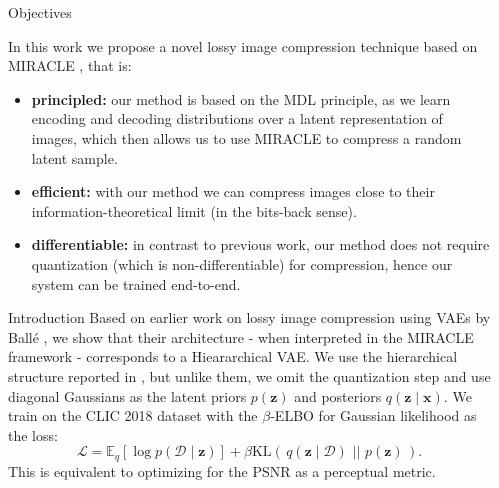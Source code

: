 \documentclass[final]{beamer}
\newlength{\sepwid}
\newlength{\onecolwid}
\renewcommand{\vec}[1]{\mathbf{#1}}
\renewcommand{\L}{\mathcal{L}}
\newcommand{\D}{\mathcal{D}}
\newcommand{\Exp}{\mathbb{E}}
\newcommand{\KL}[2]{\mathrm{KL}\left(\,#1\,\,||\,\,#2\,\right)}
\begin{document}
\begin{frame}[t] %

\begin{columns}[t] %

\begin{column}{\sepwid}\end{column} %

\begin{column}{\onecolwid} %


\begin{alertblock}{Objectives}

In this work we propose a novel lossy image compression technique based on
MIRACLE \cite{havasi2018minimal}, that is:
\begin{itemize}
\item \textbf{principled:} our method is based on the MDL principle, as we
  learn encoding and decoding distributions over a latent representation of
  images, which then allows us to use MIRACLE to compress a random
  latent sample.
\item \textbf{efficient:} with our method we can compress images close to their
  information-theoretical limit (in the bits-back sense).
\item \textbf{differentiable:} in contrast to previous work, our method does not
  require quantization (which is non-differentiable) for compression, hence our
  system can be trained end-to-end.
\end{itemize}

\end{alertblock}


\begin{block}{Introduction}
Based on earlier work on lossy image compression using VAEs by Ball\'e
\cite{balle2018variational}, we show that their architecture - when interpreted in
the MIRACLE framework - corresponds to a Hieararchical VAE. 
We use the hierarchical structure reported in \cite{balle2018variational}, but
unlike them, we omit the quantization step and use diagonal Gaussians as the
latent priors $p(\vec{z})$ and posteriors $q(\vec{z} \mid \vec{x})$.
We train on the CLIC 2018 dataset \cite{clic2018} with the $\beta$-ELBO for Gaussian
likelihood as the loss:
\begin{equation}
  \L = \Exp_q[\log p(\D \mid \vec{z})] + \beta\KL{q(\vec{z} \mid \D)}{p(\vec{z})}.
\end{equation}
This is equivalent to optimizing for the PSNR as a perceptual metric. 


\end{block}
\end{column}
\end{columns}
\end{frame}
\end{document}
